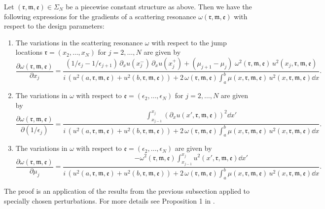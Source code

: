 \begin{prop}\label{proposition_piecewise_const}
    Let $(\mathfrak{r}, \mathfrak{m}, \mathfrak{e}) \in \Sigma_N$ be a piecewise constant structure as above. Then we have the following expressions for the gradients of a scattering resonance $\omega(\mathfrak{r}, \mathfrak{m}, \mathfrak{e})$ with respect to the design parameters:
    \begin{enumerate}[label=(\arabic*), font=\normalfont]
        \item The variations in the scattering resonance $\omega$ with respect to the jump locations $\mathfrak{r} = (x_2,\dots,x_N)$ for $j=2,\dots,N$ are given by
        \begin{equation}
            \frac{\partial \omega(\mathfrak{r}, \mathfrak{m}, \mathfrak{e})}{\partial x_j} = \frac{(1/\epsilon_j - 1/\epsilon_{j+1})\, \partial_x u(x_j^{-})\, \partial_x u(x_j^+) + (\mu_{j+1}-\mu_j) \; \omega^2(\mathfrak{r}, \mathfrak{m}, \mathfrak{e})\, u^2(x_j,\mathfrak{r}, \mathfrak{m}, \mathfrak{e})}{i\,(u^2(a,\mathfrak{r}, \mathfrak{m}, \mathfrak{e}) + u^2(b,\mathfrak{r}, \mathfrak{m}, \mathfrak{e})) + 2 \, \omega(\mathfrak{r}, \mathfrak{m}, \mathfrak{e}) \int_a^b \mu(x,\mathfrak{r}, \mathfrak{m}, \mathfrak{e}) \, u^2(x,\mathfrak{r}, \mathfrak{m}, \mathfrak{e}) \dd{x}}.
        \end{equation}
        \item The variations in $\omega$ with respect to $\mathfrak{e} = (\epsilon_2,\dots,\epsilon_N)$ for $j=2,\dots,N$ are given by
        \begin{equation}
            \frac{\partial \omega(\mathfrak{r}, \mathfrak{m}, \mathfrak{e})}{\partial (1/\epsilon_j)} = \frac{\int_{x_{j-1}}^{x_j}(\partial_x u(x',\mathfrak{r}, \mathfrak{m}, \mathfrak{e}))^2 \dd{x'}}{i\,(u^2(a,\mathfrak{r}, \mathfrak{m}, \mathfrak{e}) + u^2(b,\mathfrak{r}, \mathfrak{m}, \mathfrak{e})) + 2 \, \omega(\mathfrak{r}, \mathfrak{m}, \mathfrak{e}) \int_a^b \mu(x,\mathfrak{r}, \mathfrak{m}, \mathfrak{e}) \, u^2(x,\mathfrak{r}, \mathfrak{m}, \mathfrak{e})   \dd{x} }.
        \end{equation}
        \item The variations in $\omega$ with respect to $\mathfrak{e} = (\epsilon_2,\dots,\epsilon_N)$ are given by
        \begin{equation}
            \frac{\partial \omega(\mathfrak{r}, \mathfrak{m}, \mathfrak{e})}{\partial\mu_j} = \frac{- \omega^2(\mathfrak{r}, \mathfrak{m}, \mathfrak{e})\int_{x_{j-1}}^{x_j}u^2(x',\mathfrak{r}, \mathfrak{m}, \mathfrak{e}) \dd{x'}}{i\,(u^2(a,\mathfrak{r}, \mathfrak{m}, \mathfrak{e}) + u^2(b,\mathfrak{r}, \mathfrak{m}, \mathfrak{e})) + 2 \, \omega(\mathfrak{r}, \mathfrak{m}, \mathfrak{e}) \int_a^b \mu(x,\mathfrak{r}, \mathfrak{m}, \mathfrak{e}) \, u^2(x,\mathfrak{r}, \mathfrak{m}, \mathfrak{e})   \dd{x} }.
        \end{equation}
    \end{enumerate}
\end{prop}
The proof is an application of the results from the previous subsection applied to specially chosen perturbations. For more details see Proposition 1 in \cite{Heider2008}.
%
%
